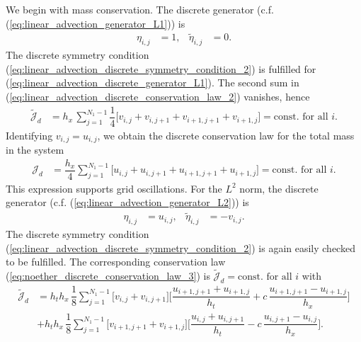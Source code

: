 \documentclass[12pt,a4paper,reqno]{article}
\begin{document}
We begin with mass conservation. The discrete generator (c.f. (\ref{eq:linear_advection_generator_L1})) is
\begin{align}\label{eq:linear_advection_discrete_generator_L1}
\eta_{i,j} &= 1 , &
\tilde{\eta}_{i,j} &= 0 .
\end{align}
The discrete symmetry condition (\ref{eq:linear_advection_discrete_symmetry_condition_2}) is fulfilled for (\ref{eq:linear_advection_discrete_generator_L1}).
The second sum in (\ref{eq:linear_advection_discrete_conservation_law_2}) vanishes, hence
\begin{align}\label{eq:noether_discrete_conservation_law_L1_1}
\tilde{\mathcal{J}}_{d} &= h_{x} \, \sum \limits_{j=1}^{N_{1}-1} \dfrac{1}{4} \Big[ v_{i,j} + v_{i,j+1} + v_{i+1,j+1} + v_{i+1,j} \Big]
= \text{const. for all $i$} .
\end{align}
Identifying ${\ensuremath{{\ensuremath{{v}}}}}_{i,j} = {\ensuremath{{\ensuremath{{u}}}}}_{i,j}$, we obtain the discrete conservation law for the total mass in the system
\begin{align}\label{eq:noether_discrete_conservation_law_L1_2}
\mathcal{J}_{d} &= \dfrac{h_{x}}{4} \sum \limits_{j=1}^{N_{1}-1} \Big[ u_{i,j} + u_{i,j+1} + u_{i+1,j+1} + u_{i+1,j} \Big]
= \text{const. for all $i$} .
\end{align}
This expression supports grid oscillations.
For the $L^{2}$ norm, the discrete generator (c.f. (\ref{eq:linear_advection_generator_L2})) is
\begin{align}\label{eq:linear_advection_discrete_generator_L2}
\eta_{i,j} &=   {\ensuremath{{\ensuremath{{u}}}}}_{i,j} , &
\tilde{\eta}_{i,j} &= - {\ensuremath{{\ensuremath{{v}}}}}_{i,j} .
\end{align}
The discrete symmetry condition (\ref{eq:linear_advection_discrete_symmetry_condition_2}) is again easily checked to be fulfilled.
The corresponding conservation law (\ref{eq:noether_discrete_conservation_law_3}) is $\tilde{\mathcal{J}}_{d} = \text{const. for all $i$}$ with
\begin{align}\label{eq:noether_discrete_conservation_law_L2_1}
\nonumber
\tilde{\mathcal{J}}_{d} 
&= h_{t} h_{x} \, \dfrac{1}{8} \sum \limits_{j=1}^{N_{1}-1}
\bigg[ v_{i,j} + v_{i,j+1} \bigg] 
\bigg[ \dfrac{u_{i+1,j+1} + u_{i+1,  j}}{h_{t}} + c \, \dfrac{u_{i+1,j+1} - u_{i+1,  j}}{h_{x}} \bigg] \\
&+ h_{t} h_{x} \, \dfrac{1}{8} \sum \limits_{j=1}^{N_{1}-1}
\bigg[ v_{i+1,j+1} + v_{i+1,j} \bigg] 
\bigg[ \dfrac{u_{i,j} + u_{i,j+1}}{h_{t}} - c \, \dfrac{u_{i,j+1} - u_{i,j}}{h_{x}} \bigg] .
\end{align}
\end{document}
